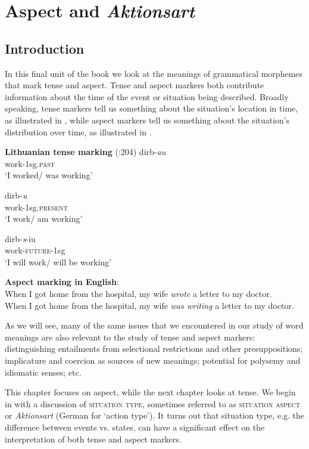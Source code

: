 \chapter{Aspect and \textit{Aktionsart}}\label{sec:20}

\section{Introduction}\label{sec:20.1}

In this final unit of the book we look at the meanings of grammatical morphemes that mark tense and aspect. Tense and aspect markers both contribute information about the time of the event or situation being described. Broadly speaking, tense markers tell us something about the situation’s location in time, as illustrated in , while aspect markers tell us something about the situation’s distribution over time, as illustrated in . 

\ea \label{ex:20.1}
\textbf{Lithuanian tense marking} (\citealt{ChungTimberlake1985}:204)
\ea 
\gll dirb-\textit{au}\\
work-1sg\textsc{.past} \\
\glt ‘I worked/ was working’

\ex
\gll  dirb-\textit{u}\\
work-1sg\textsc{.present} \\
\glt ‘I work/ am working’

\ex
\gll dirb-\textit{s}-iu\\
work-\textsc{future-}1sg \\
\glt ‘I will work/ will be working’\\
\z
\z

\ea \label{ex:20.2}
\textbf{Aspect marking in English}:\\
\ea  When I got home from the hospital, my wife \textit{wrote} a letter to my doctor.\\
\ex When I got home from the hospital, my wife \textit{was writing} a letter to my doctor.
                       \z
\z


As we will see, many of the same issues that we encountered in our study of word meanings are also relevant to the study of tense and aspect markers: distinguishing entailments from selectional restrictions and other presuppositions; implicature and coercion as sources of new meanings; potential for polysemy and idiomatic senses; etc.



This chapter focuses on aspect, while the next chapter looks at tense. We begin in  with a discussion of \textsc{situation type}, sometimes referred to as \textsc{situation aspect} or \textit{Aktionsart} (German for ‘action type’). It turns out that situation type, e.g. the difference between events vs. states, can have a significant effect on the interpretation of both tense and aspect markers.



